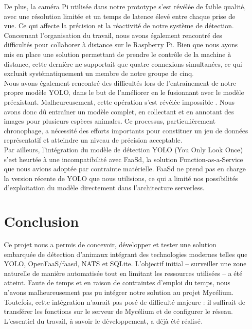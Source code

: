 \documentclass[a4paper,11pt]{article}
\begin{document}
	De plus, la caméra Pi utilisée dans notre prototype s’est révélée de faible qualité, avec une résolution limitée et un temps de latence élevé entre chaque prise de vue. Ce qui affecte la précision et la réactivité de notre système de détection.\\
	
	Concernant l'organisation du travail, nous avons également rencontré des difficultés pour collaborer à distance sur le Raspberry Pi. Bien que nous ayons mis en place une solution permettant de prendre le contrôle de la machine à distance, cette dernière ne supportait que quatre connexions simultanées, ce qui excluait systématiquement un membre de notre groupe de cinq.\\
	
	Nous avons également rencontré des difficultés lors de l'entraînement de notre propre modèle YOLO, dans le but de l’améliorer en le fusionnant avec le modèle préexistant. Malheureusement, cette opération s’est révélée impossible . Nous avons donc dû entraîner un modèle complet, en collectant et en annotant des images pour plusieurs espèces animales. Ce processus, particulièrement chronophage, a nécessité des efforts importants pour constituer un jeu de données représentatif et atteindre un niveau de précision acceptable.\\
	
	Par ailleurs, l’intégration du modèle de détection YOLO (You Only Look Once) s’est heurtée à une incompatibilité avec FaaSd, la solution Function-as-a-Service que nous avions adoptée par contrainte matérielle. FaaSd ne prend pas en charge la version récente de YOLO que nous utilisions, ce qui a limité nos possibilités d’exploitation du modèle directement dans l’architecture serverless.
	

	\section{Conclusion}
	Ce projet nous a permis de concevoir, développer et tester une solution embarquée de détection d’animaux intégrant des technologies modernes telles que YOLO, OpenFaaS/faasd, NATS et SQLite. L’objectif initial – surveiller une zone naturelle de manière automatisée tout en limitant les ressources utilisées – a été atteint. Faute de temps et en raison de contraintes d’emploi du temps, nous n’avons malheureusement pas pu intégrer notre solution au projet Mycélium. Toutefois, cette intégration n’aurait pas posé de difficulté majeure : il suffirait de transférer les fonctions sur le serveur de Mycélium et de configurer le réseau. L’essentiel du travail, à savoir le développement, a déjà été réalisé.
	
\end{document}
